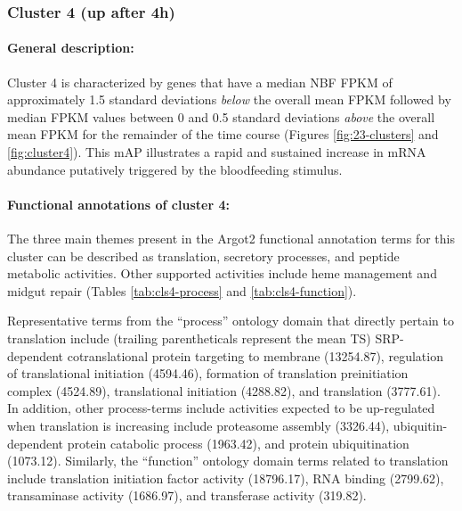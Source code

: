 \subsubsection{Cluster 4 (up after 4h)}

\paragraph*{General description:}

Cluster 4 is characterized by genes that have a median \gls{NBF} \gls{FPKM} of approximately 1.5 standard deviations \textit{below} the overall mean \gls{FPKM} followed by median \gls{FPKM} values between 0 and 0.5 standard deviations \textit{above} the overall mean \gls{FPKM} for the remainder of the time course (Figures \ref{fig:23-clusters} and \ref{fig:cluster4}).
%
This \gls{mAP} illustrates a rapid and sustained increase in mRNA abundance putatively triggered by the bloodfeeding stimulus.
%


\paragraph*{Functional annotations of cluster 4:}



The three main themes present in the \gls{Argot2} functional annotation terms for this cluster can be described as translation, secretory processes, and peptide metabolic activities.
%
Other supported activities include heme management and midgut repair (Tables \ref{tab:cls4-process} and \ref{tab:cls4-function}).



Representative terms from the ``process'' ontology domain that directly pertain to translation include (trailing parentheticals represent the mean \gls{TS}) SRP-dependent cotranslational protein targeting to membrane  (13254.87), regulation of translational initiation (4594.46), formation of translation preinitiation complex (4524.89), translational initiation (4288.82), and translation (3777.61).
%
In addition, other process-terms include activities expected to be up-regulated when translation is increasing include proteasome assembly (3326.44), ubiquitin-dependent protein catabolic process (1963.42), and protein ubiquitination (1073.12).
%
Similarly, the ``function'' ontology domain terms related to translation include translation initiation factor activity (18796.17), RNA binding (2799.62), transaminase activity (1686.97), and transferase activity (319.82).


